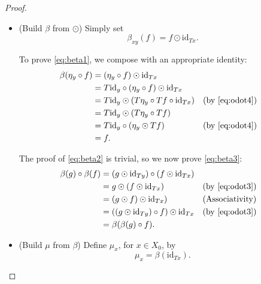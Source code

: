\documentclass[11pt]{article}
\theoremstyle{nonumberplain}
\newtheorem{proof}{Proof}
\newcommand{\id}{\mathrm{id}}
\begin{document}
\begin{proof}
\begin{itemize}
Finally, we prove \eqref{eq:odot4}.
\begin{equation}
\begin{aligned}
Th \circ (g \odot f) &= Th \circ \mu_z \circ Tg \circ f \\
&= \mu_{Tw} \circ T^2 h \circ Tg \circ f && \text{(Naturality)}\\
&= Th \odot (Tg \circ f).
\end{aligned}
\end{equation}

The first part of the proof is complete.

\item (Build $\beta$ from $\odot$) Simply set
\begin{equation}
\beta_{xy}(f) = f \odot \id_{Tx}.
\end{equation}

To prove \eqref{eq:beta1}, we compose with an appropriate identity:
\begin{equation}
\begin{aligned}
\beta(\eta_y \circ f) &= (\eta_y \circ f) \odot \id_{Tx} \\
&= T \id_y \circ (\eta_y \circ f) \odot \id_{Tx}\\
&= T \id_y \odot (T\eta_y \circ Tf \circ \id_{Tx})&&\text{(by \eqref{eq:odot4})}\\
&= T \id_y \odot (T\eta_y \circ Tf)\\
&= T \id_y \circ (\eta_y \odot Tf)&&\text{(by \eqref{eq:odot4})}\\
&= f.
\end{aligned}
\end{equation}

The proof of \eqref{eq:beta2} is trivial, so we now prove \eqref{eq:beta3}:
\begin{equation}
\begin{aligned}
\beta(g) \circ \beta(f) &= (g \odot \id_{Ty}) \circ (f \odot \id_{Tx})\\
&= g \odot (f \odot \id_{Tx}) && \text{(by \eqref{eq:odot3})}\\
&= (g \odot f) \odot \id_{Tx}) && \text{(Associativity)}\\
&= ((g \odot \id_{Ty}) \circ f) \odot \id_{Tx} && \text{(by \eqref{eq:odot3})}\\
&= \beta(\beta(g) \circ f).
\end{aligned}
\end{equation}

\item (Build $\mu$ from $\beta$) Define $\mu_x$, for $x \in X_0$, by
\begin{equation}
\mu_x = \beta(\id_{Tx}).
\end{equation}


\end{itemize}
\end{proof}
\end{document}
